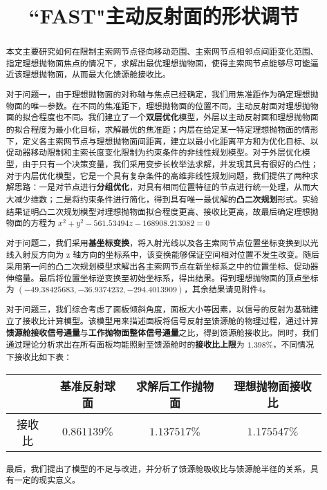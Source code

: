 \documentclass[withoutpreface,bwprint,fontset=macnew]{cumcmthesis} %
\title{``FAST"主动反射面的形状调节}
\begin{document}
	
	
	\maketitle
	\begin{abstract}
		本文主要研究如何在限制主索网节点径向移动范围、主索网节点相邻点间距变化范围、指定理想抛物面焦点的情况下，求解出最优理想抛物面，使得主索网节点能够尽可能逼近该理想抛物面，从而最大化馈源舱接收比。

		对于问题一，由于理想抛物面的对称轴与焦点已经确定，我们用焦准距作为确定理想抛物面的唯一参数。在不同的焦准距下，理想抛物面的位置不同，主动反射面对理想抛物面的拟合程度也不同。我们建立了一个\textbf{双层优化}模型，外层以主动反射面和理想抛物面的拟合程度为最小化目标，求解最优的焦准距；内层在给定某一特定理想抛物面的情形下，定义各主索网节点与理想抛物面间距离，建立以最小化距离平方和为优化目标、以促动器移动限制和主索长度变化限制为约束条件的非线性规划模型。对于外层优化模型，由于只有一个决策变量，我们采用变步长枚举法求解，并发现其具有很好的凸性；对于内层优化模型，它是一个具有复杂条件的高维非线性规划问题，我们提供了两种求解思路：一是对节点进行\textbf{分组优化}，对具有相同位置特征的节点进行统一处理，从而大大减少维数；二是将约束条件进行简化，得到具有唯一最优解的\textbf{凸二次规划}形式。实验结果证明凸二次规划模型对理想抛物面拟合程度更高、接收比更高，故最后确定理想抛物面的方程为
		$
		x^2 + y^2 -561.53494z - 168908.213082 = 0
		$
		
		对于问题二，我们采用\textbf{基坐标变换}，将入射光线以及各主索网节点位置坐标变换到以光线入射反方向为 z 轴方向的坐标系中，该变换能够保证空间相对位置不发生改变。随后采用第一问的凸二次规划模型求解出各主索网节点在新坐标系之中的位置坐标、促动器伸缩量。最后将位置坐标逆变换至初始坐标系，得出结果。得到理想抛物面的顶点坐标为 $(-49.38425683, -36.9374232, -294.4013909)$，其余结果请见附件4。

		对于问题三，我们综合考虑了面板倾斜角度，面板大小等因素，以信号的反射为基础建立了接收比计算模型。该模型用来描述面板将信号反射至馈源舱的物理过程，通过计算\textbf{馈源舱接收信号通量}与\textbf{工作抛物面整体信号通量}之比，得到馈源舱接收比。同时，我们通过理论分析求出在所有面板均能照射至馈源舱时的\textbf{接收比上限}为 $1.398\%$，不同情况下接收比如下表：
		\begin{table}[!htbp]
			\centering
			\begin{tabular}{cccc}
				\toprule[1.5pt]
				$ $ & 基准反射球面 & 求解后工作抛物面 & 理想抛物面接收比\\
				\midrule[1pt]
				接收比 & $0.861139\%$ & $1.137517\%$ & $1.175547\%$\\
				\bottomrule[1.5pt]
			\end{tabular}
		\end{table}

		最后，我们提出了模型的不足与改进，并分析了馈源舱吸收比与馈源舱半径的关系，具有一定的现实意义。
		
	\end{abstract}
\end{document}

